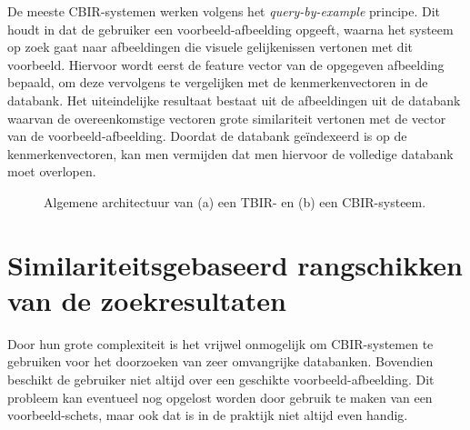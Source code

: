 De meeste CBIR-systemen werken volgens het \emph{query-by-example} principe. Dit houdt in dat de
gebruiker een voorbeeld-afbeelding opgeeft, waarna het systeem op zoek gaat naar afbeeldingen
die visuele gelijkenissen vertonen met dit voorbeeld. Hiervoor wordt eerst de feature vector van
de opgegeven afbeelding bepaald, om deze vervolgens te vergelijken met de kenmerkenvectoren in
de databank. Het uiteindelijke resultaat bestaat uit de afbeeldingen uit de databank 
waarvan de overeenkomstige vectoren grote similariteit vertonen met de vector van de 
voorbeeld-afbeelding. Doordat de databank ge\"indexeerd is op de kenmerkenvectoren, kan men 
vermijden dat men hiervoor de volledige databank moet overlopen.

\begin{figure}[tb]
\begin{center}
\caption{\label{fig:cbir_en_tbir}Algemene architectuur van (a) een TBIR- en 
(b) een CBIR-systeem.}
\end{center}
\end{figure}

\section{Similariteitsgebaseerd rangschikken van de zoekresultaten}

Door hun grote complexiteit is het vrijwel onmogelijk om CBIR-systemen te gebruiken voor het 
doorzoeken van zeer omvangrijke databanken. Bovendien beschikt de gebruiker niet altijd over
een geschikte voorbeeld-afbeelding. Dit probleem kan eventueel nog opgelost worden door gebruik
te maken van een voorbeeld-schets, maar ook dat is in de praktijk niet altijd even handig.

